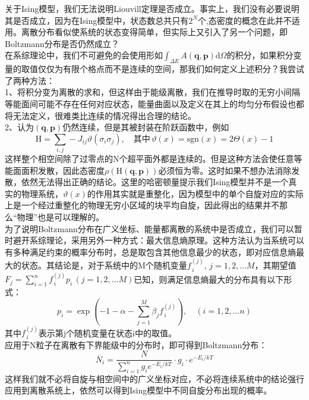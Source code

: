 \documentclass[utf8]{ctexart}
\begin{document}
	关于Ising模型，我们无法说明Liouvill定理是否成立。事实上，我们没有必要说明其是否成立，因为在Ising模型中，状态数总共只有$2^N$个,态密度的概念在此并不适用。离散分布看似使系统的状态变得简单，但实际上又引入了另一个问题，即Boltzmann分布是否仍然成立？\\

	在系综理论中，我们不可避免的会使用形如$\int_{\Delta E}A(\mathbf{q},\mathbf{p})\mathrm{d}\Omega$的积分，如果积分变量的取值仅仅为有限个格点而不是连续的空间，那我们如何定义上述积分？我尝试了两种方法：\\
	1、将积分变为离散的求和，但这样由于能级离散，我们在推导时取的无穷小间隔等能面间可能不存在任何对应状态，能量曲面以及定义在其上的均匀分布假设也都将无法定义，很难类比连续的情况得出合理的结论。\\
	2、认为$(\mathbf{q},\mathbf{p})$仍然连续，但是其被封装在阶跃函数中，例如
	\[\mathrm{H}=\sum_{i,j}-J_{ij}\vartheta(\sigma_i\sigma_{j}),\quad\text{其中}\,\vartheta(x)=\mathrm{sgn}(x)=2\Theta(x)-1
	\]
	这样整个相空间除了过零点的N个超平面外都是连续的。但是这种方法会使任意等能面面积发散，因此态密度$\rho(\mathrm{H}(\mathbf{q},\mathbf{p}))$必须恒为零。这时如果不想办法消除发散，依然无法得出正确的结论。这里的哈密顿量提示我们Ising模型并不是一个真实的物理系统，$\vartheta(x)$的作用其实就是重整化，因为模型中的单个自旋对应的实际上是一个经过重整化的物理无穷小区域的块平均自旋，因此得出的结果并不那么“物理”也是可以理解的。\\

	为了说明Boltzmann分布在广义坐标、能量都离散的系统中是否成立，我们可以暂时避开系综理论，采用另外一种方式：最大信息熵原理。这种方法认为当系统可以有多种满足约束的概率分布时，总是取包含其他信息最少的状态，即对应信息熵最大的状态。其结论是，对于系统中的M个随机变量$f_{\,i}^{(j)},\,j=1,2,\dots M$，其期望值$F_j=\sum_{i=1}^{n}f_{\,i}^{(j)}p_i\,(j=1,2,\dots M)$已知，则满足信息熵最大的分布具有以下形式：
	\[p_i=\exp(-1-\alpha-\sum_{j=1}^{M}\beta_j f_{\,i}^{(j)}),\quad(i=1,2,\dots n)\]
	其中$f_{\,i}^{(j)}$表示第j个随机变量在状态i中的取值。\\
	应用于N粒子在离散有下界能级中的分布时，即可得到Boltzmann分布：
	\[\overline{N}_i=\frac{N}{\sum_{i=1}^n g_i e^{-E_i/kT}}\cdot g_i\cdot e^{-E_i/kT} \]
	这样我们就不必将自旋与相空间中的广义坐标对应，不必将连续系统中的结论强行应用到离散系统上，依然可以得到Ising模型中不同自旋分布出现的概率。
\end{document}
